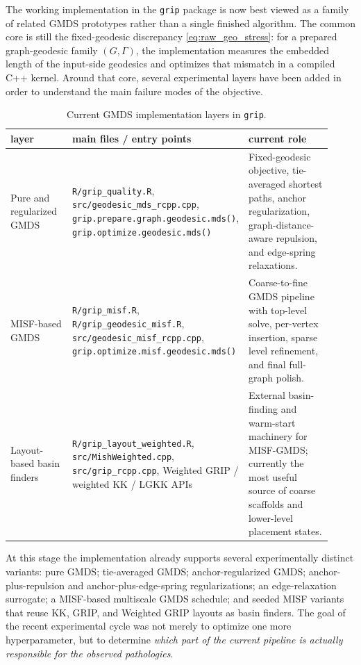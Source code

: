 \documentclass[twoside,11pt]{article}
\begin{document}
The working implementation in the \texttt{grip} package is now best viewed as
a family of related GMDS prototypes rather than a single finished algorithm.
The common core is still the fixed-geodesic discrepancy
\cref{eq:raw_geo_stress}: for a prepared graph-geodesic family
$(G,\Gamma)$, the implementation measures the embedded length of the
input-side geodesics and optimizes that mismatch in a compiled C++ kernel.
Around that core, several experimental layers have been added in order to
understand the main failure modes of the objective.

\begin{table}[t]
  \centering
  \small
  \caption{Current GMDS implementation layers in \texttt{grip}.}
  \label{tab:implementation_layers}
  \begin{tabular}{p{0.23\linewidth} p{0.34\linewidth} p{0.35\linewidth}}
    \toprule
    layer & main files / entry points & current role \\
    \midrule
    Pure and regularized GMDS &
    \texttt{R/grip\_quality.R},
    \texttt{src/geodesic\_mds\_rcpp.cpp},
    \texttt{grip.prepare.graph.geodesic.mds()},
    \texttt{grip.optimize.geodesic.mds()} &
    Fixed-geodesic objective, tie-averaged shortest paths, anchor regularization, graph-distance-aware repulsion, and edge-spring relaxations. \\
    \addlinespace
    MISF-based GMDS &
    \texttt{R/grip\_misf.R},
    \texttt{R/grip\_geodesic\_misf.R},
    \texttt{src/geodesic\_misf\_rcpp.cpp},
    \texttt{grip.optimize.misf.geodesic.mds()} &
    Coarse-to-fine GMDS pipeline with top-level solve, per-vertex insertion, sparse level refinement, and final full-graph polish. \\
    \addlinespace
    Layout-based basin finders &
    \texttt{R/grip\_layout\_weighted.R},
    \texttt{src/MishWeighted.cpp},
    \texttt{src/grip\_rcpp.cpp},
    Weighted GRIP / weighted KK / LGKK APIs &
    External basin-finding and warm-start machinery for MISF-GMDS; currently the most useful source of coarse scaffolds and lower-level placement states. \\
    \bottomrule
  \end{tabular}
\end{table}

At this stage the implementation already supports several experimentally
distinct variants: pure GMDS; tie-averaged GMDS; anchor-regularized GMDS;
anchor-plus-repulsion and anchor-plus-edge-spring regularizations; an
edge-relaxation surrogate; a MISF-based multiscale GMDS schedule; and seeded
MISF variants that reuse KK, GRIP, and Weighted GRIP layouts as basin
finders.  The goal of the recent experimental cycle was not merely to optimize
one more hyperparameter, but to determine \emph{which part of the current
pipeline is actually responsible for the observed pathologies}.
\end{document}
